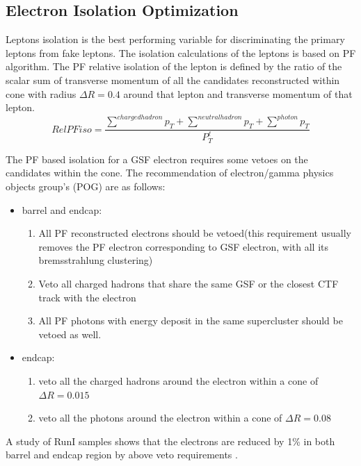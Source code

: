 \subsection{Electron Isolation Optimization}\label{sec:eleiso}
Leptons isolation is the best performing variable for discriminating the primary leptons from fake leptons. 
The isolation calculations of the leptons is  based on PF algorithm.  The PF relative isolation of the lepton is defined by the ratio of the scalar sum of 
transverse momentum of all the candidates reconstructed
within
cone with radius $\Delta R = 0.4$  around that lepton and transverse momentum of that lepton.
\begin{equation}
 RelPFiso = \frac{\sum^{charged hadron} p_T+\sum^{neutral hadron} p_T+\sum^{photon} p_T}{P_T^{\ell}}
\end{equation}
\par The PF based isolation for a GSF electron requires some vetoes on the candidates within the cone. The recommendation of  electron/gamma physics objects
group's (POG) are as follows:
\begin{itemize}
 \item barrel and endcap:
 \begin{enumerate}
  \item All PF reconstructed electrons should be vetoed(this requirement usually removes the PF electron corresponding to GSF electron, with all its
  bremsstrahlung clustering)
  \item Veto all charged hadrons that share the same GSF or the closest CTF track with the electron
  \item All PF photons with energy deposit in the same supercluster should be vetoed as well.
 \end{enumerate}
 \item endcap:
 \begin{enumerate}
  \item veto all the charged hadrons  around the electron within a cone of $\Delta R = 0.015$ 
  \item veto all the photons around the electron within a cone of $\Delta R = 0.08$
 \end{enumerate}
\end{itemize}
\par A study of RunI samples shows that the electrons are reduced by 1\% in both barrel and endcap region by  above veto requirements .


